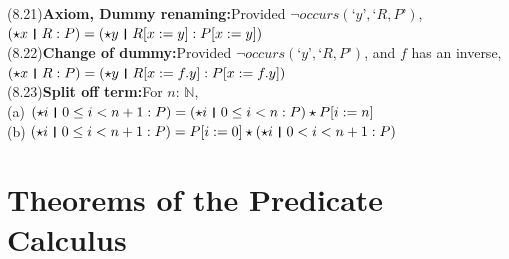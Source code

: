 \documentclass{amsart}
\newcommand{\lgap}{2pt}                             %
\newcommand{\thedr}{\rule[-.25ex]{.32mm}{1.75ex}}   %
\newcommand{\dr}{\;\,\thedr\,\;}                    %
\newcommand{\rb}{:}                                 %
\newcommand{\Lq}{\mbox{`}}
\newcommand{\Rq}{\mbox{'}}
\begin{document}
\begin{tabbing}
(8.21)\>\textbf{Axiom, Dummy renaming:}\quad Provided $\neg occurs(\Lq y\Rq ,\Lq R, P\Rq)$,\\[\lgap]
      \>$(\star x\dr R\rb P) = (\star y\dr R[x:=y]\rb P[x:=y])$\\[\lgap]
(8.22)\>\textbf{Change of dummy:}\quad Provided $\neg occurs(\Lq y\Rq ,\Lq R, P\Rq)$, and $f$ has an inverse,\\[\lgap]
      \>$(\star x\dr R\rb P) = (\star y\dr R[x:=f.y]\rb P[x:=f.y])$\\[\lgap]
(8.23)\>\textbf{Split off term:}\quad For $n$: $\mathbb{N}$,\\[\lgap]
      \> (a)\> $(\star i\dr 0\le i < n+1\rb P) = (\star i\dr 0\le i < n\rb P)\star P[i:=n]$\\[\lgap]
      \> (b)\> $(\star i\dr 0\le i < n+1\rb P) = P[i:=0]\star (\star i\dr 0< i < n+1\rb P)$\\[\lgap]
\end{tabbing}

\newpage

\section*{Theorems of the Predicate Calculus}
\end{document}
